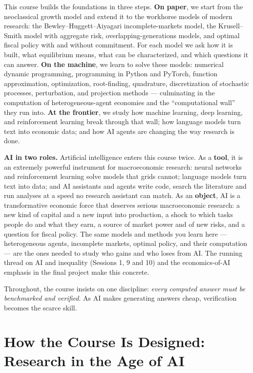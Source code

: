 \documentclass[11pt]{article}
\begin{document}
This course builds the foundations in three steps. \textbf{On paper}, we start from the neoclassical growth model and extend it to the workhorse models of modern research: the Bewley--Huggett--Aiyagari incomplete-markets model, the Krusell--Smith model with aggregate risk, overlapping-generations models, and optimal fiscal policy with and without commitment. For each model we ask how it is built, what equilibrium means, what can be characterized, and which questions it can answer. \textbf{On the machine}, we learn to solve these models: numerical dynamic programming, programming in Python and PyTorch, function approximation, optimization, root-finding, quadrature, discretization of stochastic processes, perturbation, and projection methods --- culminating in the computation of heterogeneous-agent economies and the ``computational wall'' they run into. \textbf{At the frontier}, we study how machine learning, deep learning, and reinforcement learning break through that wall; how language models turn text into economic data; and how AI agents are changing the way research is done.

\textbf{AI in two roles.} Artificial intelligence enters this course twice. As a \textbf{tool}, it is an extremely powerful instrument for macroeconomic research: neural networks and reinforcement learning solve models that grids cannot; language models turn text into data; and AI assistants and agents write code, search the literature and run analyses at a speed no research assistant can match. As an \textbf{object}, AI is a transformative economic force that deserves serious macroeconomic research: a new kind of capital and a new input into production, a shock to which tasks people do and what they earn, a source of market power and of new risks, and a question for fiscal policy. The same models and methods you learn here --- heterogeneous agents, incomplete markets, optimal policy, and their computation --- are the ones needed to study who gains and who loses from AI. The running thread on AI and inequality (Sessions 1, 9 and 10) and the economics-of-AI emphasis in the final project make this concrete.

Throughout, the course insists on one discipline: \emph{every computed answer must be benchmarked and verified}. As AI makes generating answers cheap, verification becomes the scarce skill.

\section{How the Course Is Designed: Research in the Age of AI}
\end{document}
